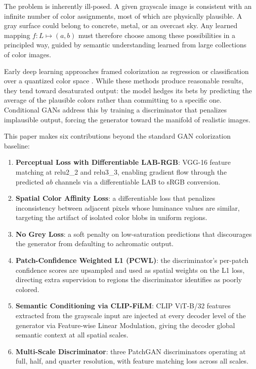 \documentclass[conference]{IEEEtran}
\begin{document}
The problem is inherently ill-posed. A given grayscale image is consistent with
an infinite number of color assignments, most of which are physically plausible.
A gray surface could belong to concrete, metal, or an overcast sky. Any learned
mapping $f: L \mapsto (a, b)$ must therefore choose among these possibilities in
a principled way, guided by semantic understanding learned from large collections
of color images.

Early deep learning approaches framed colorization as regression or classification
over a quantized color space \cite{zhang2016colorful, larsson2016learning,
iizuka2016let}. While these methods produce reasonable results, they tend toward
desaturated output: the model hedges its bets by predicting the average of the
plausible colors rather than committing to a specific one. Conditional GANs
\cite{isola2017image} address this by training a discriminator that penalizes
implausible output, forcing the generator toward the manifold of realistic images.

This paper makes six contributions beyond the standard GAN colorization baseline:

\begin{enumerate}
    \item \textbf{Perceptual Loss with Differentiable LAB-RGB}: VGG-16 feature
          matching at relu2\_2 and relu3\_3, enabling gradient flow through the
          predicted $ab$ channels via a differentiable LAB to sRGB conversion.

    \item \textbf{Spatial Color Affinity Loss}: a differentiable loss that
          penalizes inconsistency between adjacent pixels whose luminance values
          are similar, targeting the artifact of isolated color blobs in
          uniform regions.

    \item \textbf{No Grey Loss}: a soft penalty on low-saturation predictions
          that discourages the generator from defaulting to achromatic output.

    \item \textbf{Patch-Confidence Weighted L1 (PCWL)}: the discriminator's
          per-patch confidence scores are upsampled and used as spatial weights
          on the L1 loss, directing extra supervision to regions the discriminator
          identifies as poorly colored.

    \item \textbf{Semantic Conditioning via CLIP-FiLM}: CLIP ViT-B/32 features
          extracted from the grayscale input are injected at every decoder level
          of the generator via Feature-wise Linear Modulation, giving the decoder
          global semantic context at all spatial scales.

    \item \textbf{Multi-Scale Discriminator}: three PatchGAN discriminators
          operating at full, half, and quarter resolution, with feature matching
          loss across all scales.
\end{enumerate}
\end{document}
